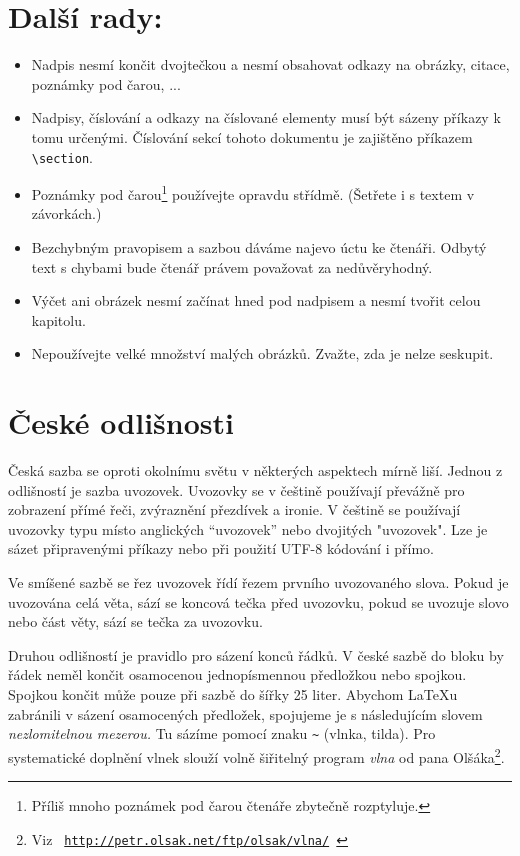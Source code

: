 \documentclass[10pt, a4paper, twocolumn]{article}
\begin{document}
\section{Další rady:}
\begin{itemize}
  \item Nadpis nesmí končit dvojtečkou a nesmí obsahovat odkazy na obrázky, citace, poznámky pod čarou, ...
  
  \item Nadpisy, číslování a odkazy na číslované elementy musí být sázeny příkazy k tomu určenými.
        Číslování sekcí tohoto dokumentu je zajištěno příkazem \verb|\section|.
        
  \item Poznámky pod čarou\footnote{Příliš mnoho poznámek pod čarou čtenáře zbytečně rozptyluje.} používejte opravdu střídmě.
        (Šetřete i s textem v závorkách.)
  
  \item Bezchybným pravopisem a sazbou dáváme najevo úctu ke čtenáři.
        Odbytý text s chybami bude čtenář právem považovat za nedůvěryhodný.
  
  \item Výčet ani obrázek nesmí začínat hned pod nadpisem a nesmí tvořit celou kapitolu.
  
  \item Nepoužívejte velké množství malých obrázků.
        Zvažte, zda je nelze seskupit.
\end{itemize}


\section{České odlišnosti}
Česká sazba se oproti okolnímu světu v některých aspektech mírně liší.
Jednou z odlišností je sazba uvozovek.
Uvozovky se v češtině používají převážně pro zobrazení přímé řeči, zvýraznění přezdívek a ironie.
V češtině se používají uvozovky typu  místo anglických ``uvozovek'' nebo dvojitých "uvozovek".
Lze je sázet připravenými příkazy nebo při použití UTF-8 kódování i přímo.

Ve smíšené sazbě se řez uvozovek řídí řezem prvního uvozovaného slova.
Pokud je uvozována celá věta, sází se koncová tečka před uvozovku, pokud se uvozuje slovo nebo část věty, sází se tečka za uvozovku.

Druhou odlišností je pravidlo pro sázení konců řádků.
V české sazbě do bloku by řádek neměl končit osamocenou jednopísmennou předložkou nebo spojkou.
Spojkou  končit může pouze při sazbě do šířky 25 liter.
Abychom {\LaTeX}u zabránili v sázení osamocených předložek, spojujeme je s následujícím slovem \emph{nezlomitelnou mezerou.}
Tu sázíme pomocí znaku \verb|~| (vlnka, tilda).
Pro systematické doplnění vlnek slouží volně šiřitelný program \emph{vlna} od pana Olšáka\footnote{Viz \texttt{ \url{http://petr.olsak.net/ftp/olsak/vlna/} } }.
\end{document}
